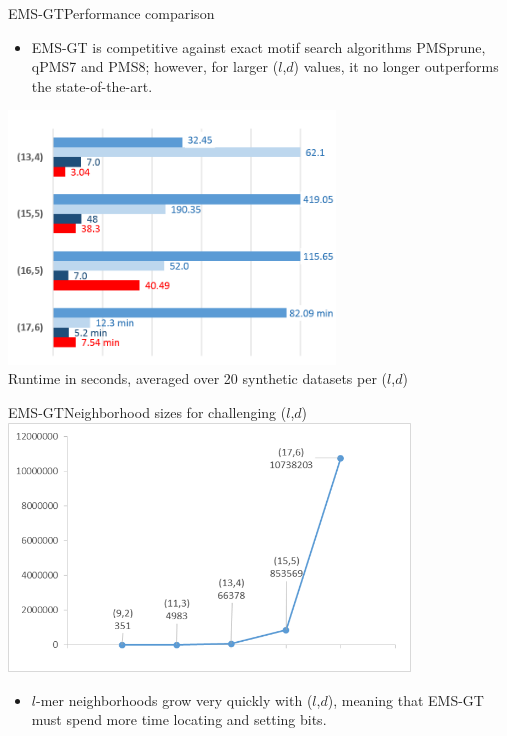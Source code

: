 \documentclass[pdf,xcolor={dvipsnames}]{beamer}
\begin{document}
 	\begin{frame}{EMS-GT}{Performance comparison}
 		\begin{itemize}
 		\item EMS-GT is competitive against exact motif search algorithms {\color{CadetBlue}PMSprune}, {\color{Blue}qPMS7} and {\color{BlueViolet}PMS8}; however, for larger ($l$,$d$) values, it no longer outperforms the state-of-the-art.
 		\end{itemize}
 		{\centering
 		\includegraphics[width=0.65\textwidth]{img/emsgt.png}\\
 		\footnotesize Runtime in seconds, averaged over 20 synthetic datasets per ($l$,$d$) \\}
 		\end{frame}

	\begin{frame}{EMS-GT}{Neighborhood sizes for challenging ($l$,$d$)}
		{\centering\includegraphics[width=0.8\textwidth]{img/nbrhd_growth}\\}
		\begin{itemize}
		\item $l$-mer neighborhoods grow very quickly with ($l$,$d$), meaning that EMS-GT must spend more time locating and setting bits.\\
		\end{itemize}
		\end{frame}
\end{document}
